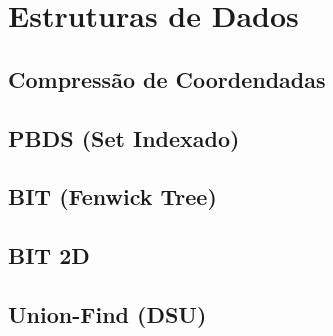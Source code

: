 % 

% 

\section{Estruturas de Dados}

\subsection{Compressão de Coordendadas}


\subsection{PBDS (Set Indexado)}


\subsection{BIT (Fenwick Tree)}


\subsection{BIT 2D}


\subsection{Union-Find (DSU)}


% 

